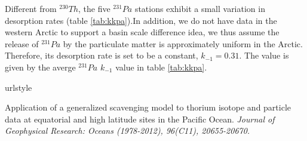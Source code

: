 \documentclass[paper=a4, fontsize=11pt]{scrartcl} %
\numberwithin{equation}{section} %
\numberwithin{figure}{section} %
\numberwithin{table}{section} %
\begin{document}
Different from $^{230}Th$, the five $^{231}Pa$ stations exhibit a small variation in desorption rates (table \ref{tab:kkpa}).In addition, we do not have data in the western Arctic to support a basin scale difference idea, we thus assume the release of $^{231}Pa$ by the particulate matter is approximately  uniform in the Arctic. Therefore, its desorption rate is set to be a constant, $k_{-1}=0.31$. The value is given by the averge $^{231}Pa$ $k_{-1}$ value in table \ref{tab:kkpa}.





\begin{thebibliography}{}

\providecommand{\natexlab}[1]{#1}
\expandafter\ifx\csname urlstyle\endcsname\relax
  \providecommand{\doi}[1]{doi:\discretionary{}{}{}#1}\else
  \providecommand{\doi}{doi:\discretionary{}{}{}\begingroup
  \urlstyle{rm}\Url}\fi

Application of a generalized scavenging model to thorium isotope and particle data at equatorial and high latitude sites in the Pacific Ocean. \textit{Journal of Geophysical Research: Oceans (1978-2012), 96(C11), 20655-20670.}
\end{thebibliography}
\end{document}

